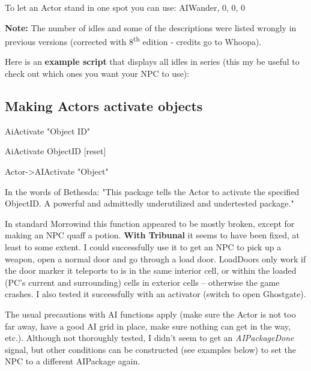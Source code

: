 \documentclass[
]{article}
\begin{document}
To let an Actor stand in one spot you can use: AIWander, 0, 0, 0

\textbf{Note:} The number of idles and some of the descriptions were
listed wrongly in previous versions (corrected with
8\textsuperscript{th} edition - credits go to Whoopa).

Here is an \textbf{example script} that displays all idles in series
(this my be useful to check out which ones you want your NPC to use):



\hypertarget{making-actors-activate-objects}{%
\subsection{\texorpdfstring{\hfill\break
Making Actors activate
objects}{ Making Actors activate objects}}\label{making-actors-activate-objects}}

AiActivate "Object ID"

AiActivate ObjectID {[}reset{]}

Actor-\textgreater AIActivate "Object"

In the words of Bethesda: "This package tells the Actor to activate the
specified ObjectID. A powerful and admittedly underutilized and
undertested package."

In standard Morrowind this function appeared to be mostly broken, except
for making an NPC quaff a potion. \textbf{With Tribunal} it seems to
have been fixed, at least to some extent. I could successfully use it to
get an NPC to pick up a weapon, open a normal door and go through a load
door. LoadDoors only work if the door marker it teleports to is in the
same interior cell, or within the loaded (PC's current and surrounding)
cells in exterior cells -- otherwise the game crashes. I also tested it
successfully with an activator (switch to open Ghostgate).

The usual precautions with AI functions apply (make sure the Actor is
not too far away, have a good AI grid in place, make sure nothing can
get in the way, etc.). Although not thoroughly tested, I didn't seem to
get an \emph{AIPackageDone} signal, but other conditions can be
constructed (see examples below) to set the NPC to a different AIPackage
again.
\end{document}
